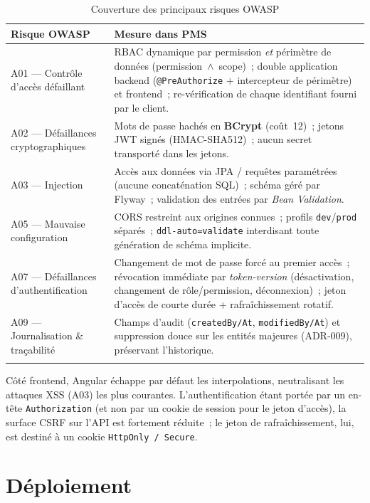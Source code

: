 \begin{longtable}{|m{4.6cm}|m{9.4cm}|}
\hline
\textbf{Risque OWASP} & \textbf{Mesure dans PMS} \\
\hline
\endhead
\endfoot
\endlastfoot
\hline
A01 --- Contrôle d'accès défaillant & RBAC dynamique par permission \emph{et} périmètre de données
(permission~$\wedge$~scope)~; double application backend (\texttt{@PreAuthorize} + intercepteur de
périmètre) et frontend~; re-vérification de chaque identifiant fourni par le client. \\
\hline
A02 --- Défaillances cryptographiques & Mots de passe hachés en \textbf{BCrypt} (coût~12)~; jetons
JWT signés (HMAC-SHA512)~; aucun secret transporté dans les jetons. \\
\hline
A03 --- Injection & Accès aux données via JPA / requêtes paramétrées (aucune concaténation SQL)~;
schéma géré par Flyway~; validation des entrées par \emph{Bean Validation}. \\
\hline
A05 --- Mauvaise configuration & CORS restreint aux origines connues~; profils \texttt{dev}/\texttt{prod}
séparés~; \texttt{ddl-auto=validate} interdisant toute génération de schéma implicite. \\
\hline
A07 --- Défaillances d'authentification & Changement de mot de passe forcé au premier accès~;
révocation immédiate par \emph{token-version} (désactivation, changement de rôle/permission,
déconnexion)~; jeton d'accès de courte durée + rafraîchissement rotatif. \\
\hline
A09 --- Journalisation \& traçabilité & Champs d'audit (\texttt{createdBy/At}, \texttt{modifiedBy/At})
et suppression douce sur les entités majeures (ADR-009), préservant l'historique. \\
\hline
\caption{Couverture des principaux risques OWASP}
\label{tab:owasp}
\end{longtable}

\noindent Côté frontend, Angular échappe par défaut les interpolations, neutralisant les attaques
XSS (A03) les plus courantes. L'authentification étant portée par un en-tête \texttt{Authorization}
(et non par un cookie de session pour le jeton d'accès), la surface CSRF sur l'API est fortement
réduite~; le jeton de rafraîchissement, lui, est destiné à un cookie \texttt{HttpOnly~/~Secure}.

\section{Déploiement}

